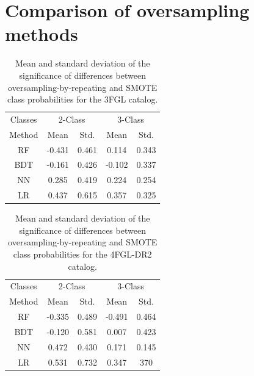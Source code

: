 \section{Comparison of oversampling methods}

\begin{table}[!h]
\caption{
Mean and standard deviation of the significance of differences between 
oversampling-by-repeating and SMOTE class probabilities for the 3FGL catalog.
}
\label{tab:OvsS_3FGL}

\tiny
\centering
\renewcommand{\tabcolsep}{1mm}
\renewcommand{\arraystretch}{1.3}

\begin{tabular}{c c c c c }
\hline
\hline
Classes&\multicolumn{2}{c}{2-Class}&\multicolumn{2}{c}{3-Class}\\
Method & Mean&Std.&Mean&Std.\\
\hline
RF& -0.431 & 0.461&0.114&0.343\\
\hline
BDT&-0.161&0.426 &-0.102&0.337\\
\hline
NN&0.285&0.419&0.224&0.254\\
\hline
LR&0.437&0.615&0.357&0.325\\
\end{tabular}
\vspace{2mm}
\end{table}





\begin{table}[!h]
\caption{
Mean and standard deviation of the significance of differences between 
oversampling-by-repeating and SMOTE class probabilities for the 4FGL-DR2 catalog.
}
\label{tab:OvsS_4FGL}

\tiny
\centering
\renewcommand{\tabcolsep}{1mm}
\renewcommand{\arraystretch}{1.3}

\begin{tabular}{c c c c c}
\hline
\hline
Classes&\multicolumn{2}{c}{2-Class}&\multicolumn{2}{c}{3-Class}\\
Method & Mean&Std.&Mean&Std.\\
\hline
RF& -0.335 & 0.489&-0.491&0.464\\
\hline
BDT&-0.120&0.581 &0.007&0.423\\
\hline
NN&0.472&0.430&0.171&0.145\\
\hline
LR&0.531&0.732&0.347&370\\
\end{tabular}
\vspace{2mm}
\end{table}

